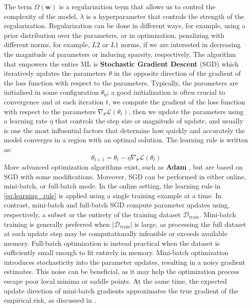 The term $\Omega(\mathbf{w})$ is a regularization term that allows us to control the complexity of the model, $\lambda$
is a hyperparameter that controls the strength of the regularization.\newline
Regularization can be done in different ways, for example, using a prior distribution over the parameters, or in optimization, penalizing with different 
norms, for example, $L2$ or $L1$ norms, if we are interested in decreasing the magnitude of parameters or inducing sparsity, respectively.\newline
The algorithm that empowers the entire ML is \textbf{Stochastic Gradient Descent} (SGD) \cite[pag. 152, Ch 5.2]{Goodfellow-et-al-2016} 
which iteratively updates the parameters $\theta$ in the opposite direction of the gradient of the loss function with respect to the parameters.
Typically, the parameters are initialised in some configuration $\theta_0$; a good initialization is often crucial to convergence
 and at each iteration $t$, we compute the gradient of the loss function
with respect to the parameters $\nabla_\theta \mathcal{L}(\theta_t)$, then we update the parameters using a learning rate $\eta$ that controls the step size or magnitude of update, and usually is one 
the most influential factors that determine how quickly and accurately the model converges in a region with an optimal solution.
\newline
The learning rule is written as:
\begin{equation}
    \label{eq:learning_rule}
    \theta_{t+1} = \theta_t - \eta \nabla_\theta \mathcal{L}(\theta_t)
\end{equation}
More advanced optimization algorithms exist, such as \textbf{Adam} \cite{kingma2017adammethodstochasticoptimization}, but are based on SGD with some modifications.
Moreover, SGD can be performed in either
online, mini-batch, or full-batch mode.
In the online setting, the learning rule in \eqref{eq:learning_rule} is
applied using a single training example at a time.
In contrast, mini-batch and full-batch SGD compute parameter updates using,
respectively, a subset or the entirety of the training dataset
$\mathcal{D}_{\text{train}}$.
Mini-batch training is generally preferred when $|\mathcal{D}_{\text{train}}|$
is large, as processing the full dataset at each update step may be
computationally infeasible or exceeds available memory.
Full-batch optimization is instead practical when the dataset is sufficiently
small enough to fit entirely in memory.
Mini-batch optimization introduces
stochasticity into the parameter updates, resulting in a noisy gradient
estimates.
This noise can be beneficial, as it may help the optimization process escape
poor local minima or saddle points.
At the same time, the expected update direction of mini-batch gradients
approximates the true gradient of the empirical risk, as discussed
in \cite{WILSON20031429}.

